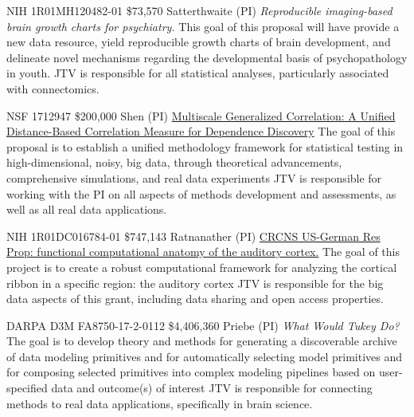 \documentclass[10pt,colorlinks=true,urlcolor=blue]{moderncv}
\begin{document}
        
    {NIH 1R01MH120482-01}%
    {\$73,570} 
    {Satterthwaite (PI)}
    {\emph{Reproducible imaging-based brain growth charts for psychiatry.} 
    This  goal of this proposal will have provide a new data resource, yield reproducible growth charts of brain development, and delineate novel mechanisms regarding the developmental basis of psychopathology in youth.}
    {JTV is responsible for all statistical analyses, particularly associated with connectomics.}
    {}


    {NSF 1712947}%
    {\$200,000} 
    {Shen (PI)}
    {\href{http://grantome.com/grant/NSF/DMS-1921310}%
    {Multiscale Generalized Correlation: A Unified Distance-Based Correlation Measure for Dependence Discovery} 
    The  goal of this proposal is to establish a unified methodology framework for statistical testing in high-dimensional, noisy, big data, through theoretical advancements, comprehensive simulations, and real data experiments}%
    {JTV is responsible for working with the PI on all aspects of methods development and assessments, as well as all real data applications.}
    {}


    {NIH 1R01DC016784-01}%
    {\$747,143} 
    {Ratnanather (PI)}
    {\href{http://grantome.com/grant/NIH/R01-DC016784-02}%
    {CRCNS US-German Res Prop: functional computational anatomy of the auditory cortex.} 
    The goal of this project is to create a robust computational framework for analyzing the cortical ribbon in a specific region: the auditory cortex}
    {JTV is responsible for the big data aspects of this grant, including data sharing and open access properties.}
    {}


%
    {DARPA D3M FA8750-17-2-0112}%
    {\$4,406,360}%
    {Priebe (PI)}
    {\emph{What Would Tukey Do?} 
    The goal is to develop theory and methods for generating a discoverable archive of data modeling primitives and for automatically selecting model primitives and for composing selected primitives into complex modeling pipelines based on user-specified data and outcome(s) of interest}%
    {JTV is responsible for connecting methods to real data applications, specifically in brain science.}
    {}
\end{document}

